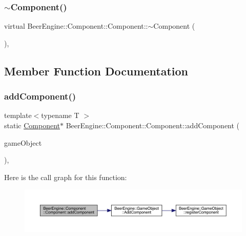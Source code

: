 \subsubsection{\texorpdfstring{$\sim$\+Component()}{~Component()}}
{\footnotesize\ttfamily virtual Beer\+Engine\+::\+Component\+::\+Component\+::$\sim$\+Component (\begin{DoxyParamCaption}\item[{void}]{ }\end{DoxyParamCaption})\hspace{0.3cm}{\ttfamily [inline]}, {\ttfamily [virtual]}}



\subsection{Member Function Documentation}
\mbox{\label{class_beer_engine_1_1_component_1_1_component_aeab2d433593f452807e81d1ada9f4c17}} 
\subsubsection{\texorpdfstring{add\+Component()}{addComponent()}}
{\footnotesize\ttfamily template$<$typename T $>$ \\
static \mbox{\hyperlink{class_beer_engine_1_1_component_1_1_component}{Component}}$\ast$ Beer\+Engine\+::\+Component\+::\+Component\+::add\+Component (\begin{DoxyParamCaption}\item[{\mbox{\hyperlink{class_beer_engine_1_1_game_object}{Game\+Object}} $\ast$}]{game\+Object }\end{DoxyParamCaption})\hspace{0.3cm}{\ttfamily [inline]}, {\ttfamily [static]}}

Here is the call graph for this function\+:\nopagebreak
\begin{figure}[H]
\begin{center}
\leavevmode
\includegraphics[width=350pt]{class_beer_engine_1_1_component_1_1_component_aeab2d433593f452807e81d1ada9f4c17_cgraph}
\end{center}
\end{figure}
\mbox{\label{class_beer_engine_1_1_component_1_1_component_a646c01f1d1d951e58431a80f68778b84}} 
